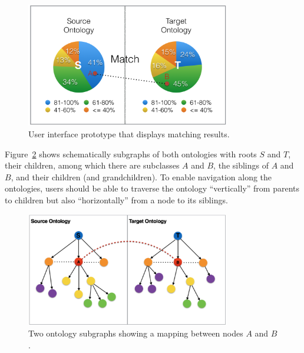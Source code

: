 \begin{figure}[htb]
	\centering
	\includegraphics[width=3.5in]{pics/proto_pie.png}
	\caption{User interface prototype that displays matching results.}
	\label{fig:proto_pie}
\end{figure}
	
Figure~\ref{fig:proto_tree} shows schematically subgraphs of both
ontologies with roots $S$ and $T$, their children, among which there
are subclasses $A$ and $B$, the siblings of $A$ and $B$, and their
children (and grandchildren). To
enable navigation along the ontologies, users should be able to
traverse the ontology ``vertically'' from parents to children but also
``horizontally'' from a node to its siblings. 

\begin{figure}[htb]
	\centering
	\includegraphics[width=3.5in]{pics/proto_tree.png}
	\caption{Two ontology subgraphs showing a mapping between nodes $A$
          and $B$.}
	\label{fig:proto_tree}
\end{figure}


